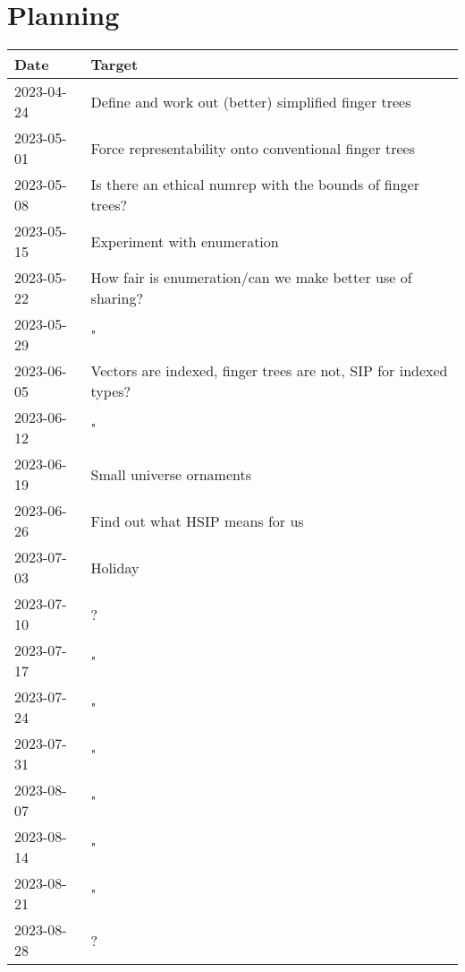 \documentclass{article}
\theoremstyle{plain}%
\theoremstyle{definition}
\begin{document}
\section{Planning}\label{sec:planning}
\begin{longtable}{l l}
Date & Target \\
\hline
2023-04-24 & Define and work out (better) simplified finger trees               \\
2023-05-01 & Force representability onto conventional finger trees              \\
2023-05-08 & Is there an ethical numrep with the bounds of finger trees?        \\
2023-05-15 & Experiment with enumeration                                        \\
2023-05-22 & How fair is enumeration/can we make better use of sharing?         \\
2023-05-29 & "                                                                  \\
2023-06-05 & Vectors are indexed, finger trees are not, SIP for indexed types?  \\
2023-06-12 & "                                                                  \\
2023-06-19 & Small universe ornaments                                           \\
2023-06-26 & Find out what HSIP means for us                                    \\
2023-07-03 & Holiday                                                            \\
2023-07-10 & ?                                                                  \\
2023-07-17 & "                                                                  \\
2023-07-24 & "                                                                  \\
2023-07-31 & "                                                                  \\
2023-08-07 & "                                                                  \\
2023-08-14 & "                                                                  \\
2023-08-21 & "                                                                  \\
2023-08-28 & ?                                                                  \\

\end{longtable}
\end{document}
